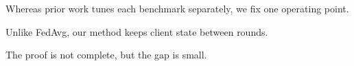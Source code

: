 Whereas prior work tunes each benchmark separately, we fix one operating point.

Unlike FedAvg, our method keeps client state between rounds.

The proof is not complete, but the gap is small.
